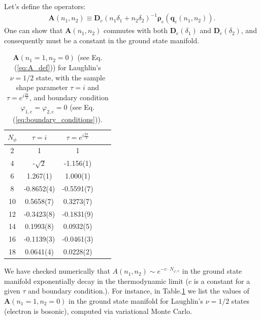 \begin{subappendices}
    Let's define the operators:
    \begin{align}
        \mathbf A(n_1,n_2)\equiv \pmb{\bm D}_e(n_1\delta_1+n_2\delta_2)^{-1} \pmb{\boldsymbol\rho}_e(\mathbf q_e(n_1,n_2)).\label{eq:A_def}
    \end{align}
    One can show that $\mathbf A(n_1,n_2)$ commutes with both $\pmb{\bm D}_e(\delta_1)$ and $\pmb{\bm D}_e(\delta_2)$, and consequently must be a constant in the ground state manifold.


    \begin{table}
        \centering
        \vspace{2mm}
        \begin{tabular}{||c | c | c | c | c||}
            \hline
            $N_\phi$ & $\tau=i$    & $\tau=e^{i\frac{2\pi}{3}}$ \\
            \hline\hline
            2        & 1           & 1                          \\\hline
            4        & -$\sqrt{2}$ & -1.156(1)                  \\\hline
            6        & 1.267(1)    & 1.000(1)                   \\\hline
            8        & -0.8652(4)  & -0.5591(7)                 \\\hline
            10       & 0.5658(7)   & 0.3273(7)                  \\\hline
            12       & -0.3423(8)  & -0.1831(9)                 \\\hline
            14       & 0.1993(8)   & 0.0932(5)                  \\\hline
            16       & -0.1139(3)  & -0.0461(3)                 \\\hline
            18       & 0.0641(4)   & 0.0228(2)                  \\\hline
            \hline
        \end{tabular}
        \caption{$\mathbf A(n_1=1,n_2=0)$ (see Eq.(\ref{eq:A_def})) for Laughlin's $\nu=1/2$ state, with the sample shape parameter $\tau=i$ and $\tau=e^{i\frac{2\pi}{3}}$, and boundary condition $\varphi_{1,e}=\varphi_{2,e}=0$ (see Eq.(\ref{eq:boundary_conditions})).}
        \label{tb:rho_v_expectation}
    \end{table}

    We have checked numerically that $A(n_1,n_2)\sim e^{-c \cdot N_{\varphi,e}}$ in the ground state manifold exponentially decay in the thermodynamic limit ($c$ is a constant for a given $\tau$ and boundary condition.). For instance, in Table.\ref{tb:rho_v_expectation} we list the values of $\mathbf A(n_1=1,n_2=0)$ in the ground state manifold for Laughlin's $\nu=1/2$ states (electron is bosonic), computed via variational Monte Carlo.


\end{subappendices}
